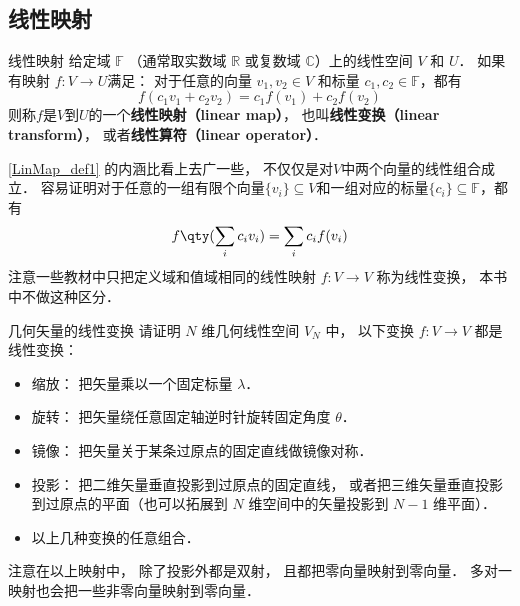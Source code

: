 
\begin{issues}
\end{issues}



\subsection{线性映射}
\begin{definition}{线性映射}\label{LinMap_def1}
给定域 $\mathbb F$ （通常取实数域 $\mathbb R$ 或复数域 $\mathbb C$）上的线性空间 $V$ 和 $U$． 如果有映射 $f:V\rightarrow U$满足： 对于任意的向量 ${v}_1, {v}_2\in V$ 和标量 $c_1, c_2 \in \mathbb{F}$，都有
\begin{equation}
f(c_1 {v}_1+c_2 {v}_2)=c_1f({v}_1)+c_2f({v}_2)
\end{equation}
则称$f$是$V$到$U$的一个\textbf{线性映射（linear map）}， 也叫\textbf{线性变换（linear transform）}， 或者\textbf{线性算符（linear operator）}．
\end{definition}

\autoref{LinMap_def1} 的内涵比看上去广一些， 不仅仅是对$V$中两个向量的线性组合成立． 容易证明对于任意的一组有限个向量$\{{v}_i\}\subseteq V$和一组对应的标量$\{c_i\}\subseteq\mathbb{F}$，都有
\begin{equation}\label{LinMap_eq1}
f\qty(\sum_i c_i {v}_i)=\sum_i c_i f({v}_i)
\end{equation}
注意一些教材中只把定义域和值域相同的线性映射 $f:V\to V$ 称为线性变换， 本书中不做这种区分．

\begin{exercise}{几何矢量的线性变换}
请证明 $N$ 维几何线性空间 $V_N$ 中， 以下变换 $f:V\to V$ 都是线性变换：
\begin{itemize}
\item 缩放： 把矢量乘以一个固定标量 $\lambda$．
\item 旋转： 把矢量绕任意固定轴逆时针旋转固定角度 $\theta$．
\item 镜像： 把矢量关于某条过原点的固定直线做镜像对称．
\item 投影： 把二维矢量垂直投影到过原点的固定直线， 或者把三维矢量垂直投影到过原点的平面（也可以拓展到 $N$ 维空间中的矢量投影到 $N-1$ 维平面）．
\item 以上几种变换的任意组合．
\end{itemize}
\end{exercise}
注意在以上映射中， 除了投影外都是双射， 且都把零向量映射到零向量． 多对一映射也会把一些非零向量映射到零向量．


